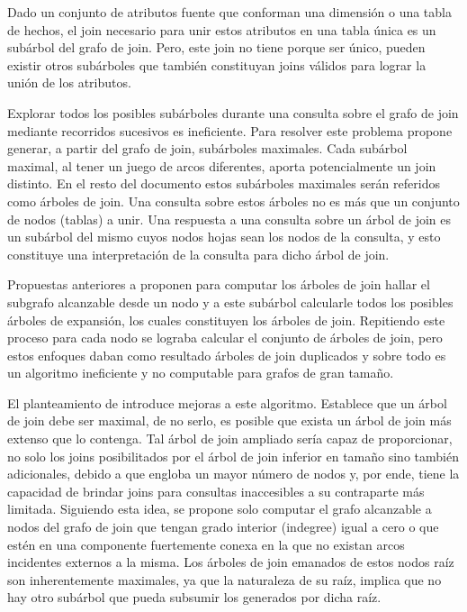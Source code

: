 Dado un conjunto de atributos fuente que conforman una dimensión o una tabla de hechos, el join necesario 
para unir estos atributos en una tabla \'unica es un sub\'arbol del grafo de join. Pero, este join no tiene 
porque ser \'unico, pueden existir otros sub\'arboles que también constituyan joins válidos para lograr 
la uni\'on de los atributos. 

Explorar todos los posibles sub\'arboles durante una consulta sobre el grafo de join mediante 
recorridos sucesivos es ineficiente. Para resolver este problema \cite{mason2005autojoin} propone 
generar, a partir del grafo de join, sub\'arboles maximales. Cada sub\'arbol maximal, al tener un juego 
de arcos diferentes, aporta potencialmente un join distinto. En el resto del documento estos sub\'arboles 
maximales ser\'an referidos como \'arboles de join. Una consulta sobre estos \'arboles no es m\'as que 
un conjunto de nodos (tablas) a unir. Una respuesta a una consulta sobre un \'arbol de join es un sub\'arbol 
del mismo cuyos nodos hojas sean los nodos de la consulta, y esto constituye una interpretación 
de la consulta para dicho  \'arbol de join.

Propuestas anteriores a \cite{mason2005autojoin} proponen para computar los \'arboles de join hallar 
el subgrafo alcanzable desde un nodo y a este sub\'arbol calcularle todos los posibles \'arboles de 
expansión, los cuales constituyen los \'arboles de join. Repitiendo este proceso para cada nodo se lograba 
calcular el conjunto de \'arboles de join, 
pero estos enfoques daban como resultado \'arboles de join duplicados y sobre todo 
es un algoritmo ineficiente y no computable para grafos de gran tamaño.

El planteamiento de \cite{mason2005autojoin} introduce mejoras a este algoritmo. Establece que un \'arbol 
de join debe ser maximal, de no serlo, es posible que exista un \'arbol de join m\'as extenso que lo contenga. 
Tal \'arbol de join ampliado sería capaz de proporcionar, no solo 
los joins posibilitados por el \'arbol de join inferior en tamaño sino también adicionales, debido a que engloba 
un mayor número de nodos y, por ende, tiene la capacidad de brindar joins para consultas inaccesibles a su 
contraparte más limitada. Siguiendo esta idea, se propone solo computar el grafo alcanzable 
a nodos del grafo de join que tengan grado interior (indegree) igual a cero o que est\'en en una 
componente fuertemente conexa en la que no existan arcos incidentes externos a la misma. 
Los \'arboles de join emanados de estos nodos raíz son inherentemente maximales, ya que la naturaleza de su raíz, 
implica que no hay otro subárbol que pueda subsumir los generados por dicha raíz.


